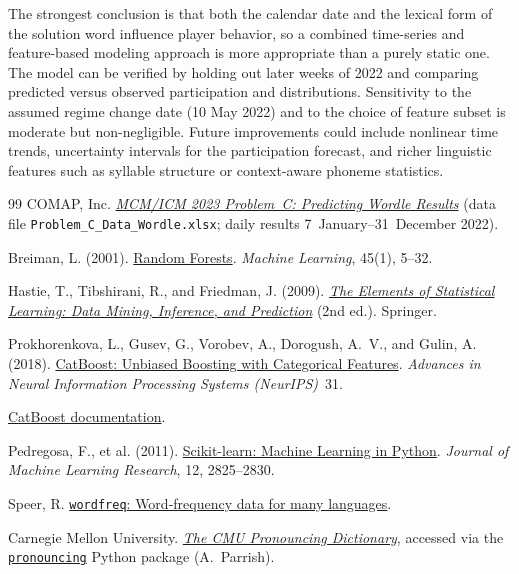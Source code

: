 \documentclass{article}
\begin{document}
The strongest conclusion is that both the calendar date and the lexical form
of the solution word influence player behavior, so a combined time-series and
feature-based modeling approach is more appropriate than a purely static one.
The model can be verified by holding out later weeks of 2022 and comparing
predicted versus observed participation and distributions. Sensitivity to the
assumed regime change date (10 May 2022) and to the choice of feature subset
is moderate but non-negligible. Future improvements could include nonlinear
time trends, uncertainty intervals for the participation forecast, and richer
linguistic features such as syllable structure or context-aware phoneme
statistics.

\begin{thebibliography}{99}
   COMAP, Inc. \href{https://www.contest.comap.com/undergraduate/contests/mcm/contests/2023/problems/}{\emph{MCM/ICM 2023 Problem~C: Predicting Wordle Results}}
        (data file \texttt{Problem\_C\_Data\_Wordle.xlsx}; daily results
        7~January--31~December 2022).

   Breiman, L. (2001). \href{https://doi.org/10.1023/A:1010933404324}{Random Forests}.
        \emph{Machine Learning}, 45(1), 5--32.

   Hastie, T., Tibshirani, R., and Friedman, J. (2009).
        \href{https://doi.org/10.1007/978-0-387-84858-7}{\emph{The Elements of
        Statistical Learning: Data Mining, Inference, and Prediction}}
        (2nd ed.). Springer.

   Prokhorenkova, L., Gusev, G., Vorobev, A., Dorogush,
        A.~V., and Gulin, A. (2018). \href{https://arxiv.org/abs/1706.09516}{CatBoost:
        Unbiased Boosting with Categorical Features}. \emph{Advances in Neural
        Information Processing Systems (NeurIPS)}~31.

   \href{https://catboost.ai/}{CatBoost documentation}.

   Pedregosa, F., et al. (2011).
        \href{https://jmlr.org/papers/v12/pedregosa11a.html}{Scikit-learn:
        Machine Learning in Python}. \emph{Journal of Machine Learning
        Research}, 12, 2825--2830.

   Speer, R. \href{https://github.com/rspeer/wordfreq}{\texttt{wordfreq}:
        Word-frequency data for many languages}.

   Carnegie Mellon University.
        \href{http://www.speech.cs.cmu.edu/cgi-bin/cmudict}{\emph{The CMU
        Pronouncing Dictionary}}, accessed via the
        \href{https://github.com/aparrish/pronouncing}{\texttt{pronouncing}}
        Python package (A.~Parrish).


\end{thebibliography}
\end{document}
